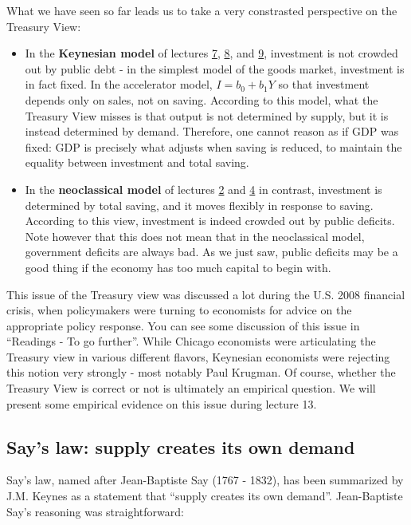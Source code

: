 \documentclass[]{book}
\theoremstyle{definition}
\theoremstyle{definition}
\theoremstyle{definition}
\theoremstyle{remark}
\begin{document}
What we have seen so far leads us to take a very constrasted perspective
on the Treasury View:

\begin{itemize}
\item
  In the \textbf{Keynesian model} of lectures \href{lecture7.html}{7},
  \href{lecture8.html}{8}, and \href{lecture9.html}{9}, investment is
  not crowded out by public debt - in the simplest model of the goods
  market, investment is in fact fixed. In the accelerator model,
  \(I=b_0 + b_1 Y\) so that investment depends only on sales, not on
  saving. According to this model, what the Treasury View misses is that
  output is not determined by supply, but it is instead determined by
  demand. Therefore, one cannot reason as if GDP was fixed: GDP is
  precisely what adjusts when saving is reduced, to maintain the
  equality between investment and total saving.
\item
  In the \textbf{neoclassical model} of lectures \href{lecture2.html}{2}
  and \href{lecture4.html}{4} in contrast, investment is determined by
  total saving, and it moves flexibly in response to saving. According
  to this view, investment is indeed crowded out by public deficits.
  Note however that this does not mean that in the neoclassical model,
  government deficits are always bad. As we just saw, public deficits
  may be a good thing if the economy has too much capital to begin with.
\end{itemize}

This issue of the Treasury view was discussed a lot during the U.S. 2008
financial crisis, when policymakers were turning to economists for
advice on the appropriate policy response. You can see some discussion
of this issue in ``Readings - To go further''. While Chicago economists
were articulating the Treasury view in various different flavors,
Keynesian economists were rejecting this notion very strongly - most
notably Paul Krugman. Of course, whether the Treasury View is correct or
not is ultimately an empirical question. We will present some empirical
evidence on this issue during lecture 13.

\subsection{Say's law: supply creates its own
demand}\label{says-law-supply-creates-its-own-demand}

Say's law, named after Jean-Baptiste Say (1767 - 1832), has been
summarized by J.M. Keynes as a statement that ``supply creates its own
demand''. Jean-Baptiste Say's reasoning was straightforward:
\end{document}
